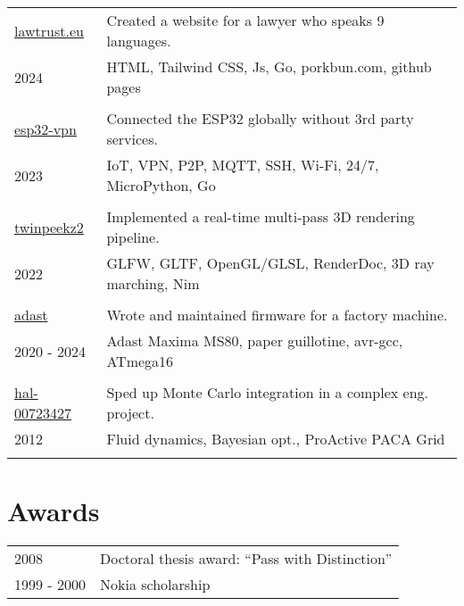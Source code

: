 \documentclass[a4paper,12pt]{article}
\begin{document}
\begin{tabularx}{\textwidth}{@{}p{3cm}X@{}}

\href{https://github.com/aabbtree77/law2}{lawtrust.eu} & Created a website for a lawyer who speaks 9 languages.\\
               2024    & HTML, Tailwind CSS, Js, Go, porkbun.com, github pages\\
                       &\\
\href{https://github.com/aabbtree77/esp32-vpn}{esp32-vpn} & Connected the ESP32 globally without 3rd party services.\\
               2023    & IoT, VPN, P2P, MQTT, SSH, Wi-Fi, 24/7, MicroPython, Go\\
                       &\\
\href{https://github.com/aabbtree77/twinpeekz2}{twinpeekz2}    & Implemented a real-time multi-pass 3D rendering pipeline.\\
                   2022       & GLFW, GLTF, OpenGL/GLSL, RenderDoc, 3D ray marching, Nim\\
                          &\\
\href{https://github.com/aabbtree77/adast}{adast} & Wrote and maintained firmware for a factory machine. \\
2020 - 2024 & Adast Maxima MS80, paper guillotine, avr-gcc, ATmega16 \\
     &\\                        
\href{https://hal.archives-ouvertes.fr/hal-00723427}{hal-00723427} & Sped up Monte Carlo integration in a complex eng. project.\\
                     2012 & Fluid dynamics, Bayesian opt., ProActive PACA Grid\\
                          &  \\        
\end{tabularx}

%
\section*{Awards}
%
\begin{tabularx}{\textwidth}{@{}p{3cm}X@{}}
        2008 & Doctoral thesis award: “Pass with Distinction”\\
        1999 - 2000 & Nokia scholarship
\end{tabularx}
\end{document}
